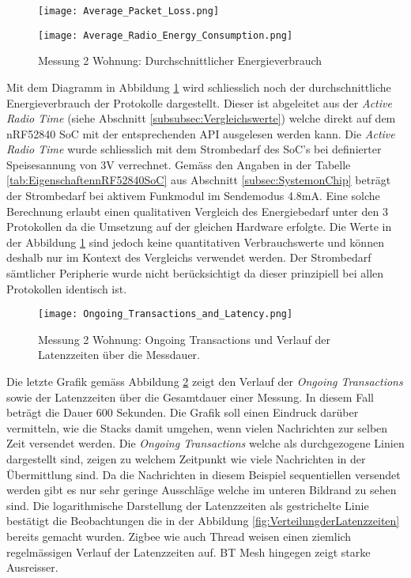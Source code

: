 \begin{figure}[!htbp]
\centering
\begin{minipage}[b]{0.49\textwidth}
		\centering
		\texttt{[image: Average\_Packet\_Loss.png]}
		\caption{Messung 2 Wohnung: Durchschnittlicher Paketverlust}
		\label{fig:DurchschnittlicherPaketverlust}
\end{minipage}
\begin{minipage}[b]{0.49\textwidth}
		\centering
		\texttt{[image: Average\_Radio\_Energy\_Consumption.png]}
		\caption{Messung 2 Wohnung: Durchschnittlicher Energieverbrauch}
		\label{fig:DurchschnittlicherEnergieverbrauch}
\end{minipage}
\end{figure}

Mit dem Diagramm in Abbildung \ref{fig:DurchschnittlicherEnergieverbrauch} wird schliesslich noch der durchschnittliche Energieverbrauch der Protokolle dargestellt.
Dieser ist abgeleitet aus der \textit{Active Radio Time} (siehe Abschnitt \ref{subsubsec:Vergleichswerte}) welche direkt auf dem nRF52840 SoC mit der entsprechenden API ausgelesen werden kann.
Die \textit{Active Radio Time} wurde schliesslich mit dem Strombedarf des SoC's bei definierter Speisesannung von 3V verrechnet.
Gemäss den Angaben in der Tabelle \ref{tab:EigenschaftennRF52840SoC} aus Abschnitt \ref{subsec:SystemonChip} beträgt der Strombedarf bei aktivem Funkmodul im Sendemodus 4.8mA.
Eine solche Berechnung erlaubt einen qualitativen Vergleich des Energiebedarf unter den 3 Protokollen da die Umsetzung auf der gleichen Hardware erfolgte.
Die Werte in der Abbildung \ref{fig:DurchschnittlicherEnergieverbrauch} sind jedoch keine quantitativen Verbrauchswerte und können deshalb nur im Kontext des Vergleichs verwendet werden.
Der Strombedarf sämtlicher Peripherie wurde nicht berücksichtigt da dieser prinzipiell bei allen Protokollen identisch ist.

\begin{figure}[h]
	\centering
	\texttt{[image: Ongoing\_Transactions\_and\_Latency.png]}
	\caption{Messung 2 Wohnung: Ongoing Transactions und Verlauf der Latenzzeiten über die Messdauer.}
	\label{fig:OngoingTransactions}
\end{figure}

Die letzte Grafik gemäss Abbildung \ref{fig:OngoingTransactions} zeigt den Verlauf der \textit{Ongoing Transactions} sowie der Latenzzeiten über die Gesamtdauer einer Messung.
In diesem Fall beträgt die Dauer 600 Sekunden.
Die Grafik soll einen Eindruck darüber vermitteln, wie die Stacks damit umgehen, wenn vielen Nachrichten zur selben Zeit versendet werden.
Die \textit{Ongoing Transactions} welche als durchgezogene Linien dargestellt sind, zeigen zu welchem Zeitpunkt wie viele Nachrichten in der Übermittlung sind.
Da die Nachrichten in diesem Beispiel sequentiellen versendet werden gibt es nur sehr geringe Ausschläge welche im unteren Bildrand zu sehen sind.
Die logarithmische Darstellung der Latenzzeiten als gestrichelte Linie bestätigt die Beobachtungen die in der Abbildung \ref{fig:VerteilungderLatenzzeiten} bereits gemacht wurden.
Zigbee wie auch Thread weisen einen ziemlich regelmässigen Verlauf der Latenzzeiten auf.
BT Mesh hingegen zeigt starke Ausreisser.

